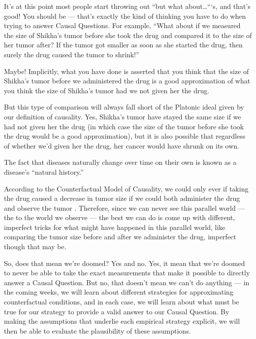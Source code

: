 \documentclass[letterpaper,10pt,english]{jupyterBook}
\begin{document}
\sphinxAtStartPar
It’s at this point most people start throwing out “but what about…“‘s, and that’s good! You should be — that’s exactly the kind of thinking you have to do when trying to answer Causal Questions. For example, “What about if we measured the size of Shikha’s tumor before she took the drug and compared it to the size of her tumor after? If the tumor got smaller as soon as she started the drug, then surely the drug caused the tumor to shrink!”

\sphinxAtStartPar
Maybe! Implicitly, what you have done is asserted that you think that the size of Shikha’s tumor before we administered the drug is a good approximation of what you think the size of Shikha’s tumor  had we not given her the drug.

\sphinxAtStartPar
But this type of comparison will always fall short of the Platonic ideal given by our definition of causality. Yes, Shikha’s tumor  have stayed the same size if we had not given her the drug (in which case the size of the tumor before she took the drug would be a good approximation), but it is also possible that regardless of whether we’d given her the drug, her cancer would have shrunk on its own.%
\begin{footnote}[1]\sphinxAtStartFootnote
The fact that diseases naturally change over time on their own is known as a disease’s “natural history.”
%
\end{footnote}

\sphinxAtStartPar
According to the Counterfactual Model of Causality, we could only ever  if taking the drug caused a decrease in tumor size if we could both administer the drug and observe the tumor . Therefore, since we can never see this parallel world — the  to the world we observe — the best we can do is come up with different, imperfect tricks for  what might have happened in this parallel world, like comparing the tumor size before and after we administer the drug, imperfect though that may be.

\sphinxAtStartPar
So, does that mean we’re doomed? Yes and no. Yes, it  mean that we’re doomed to never be able to take the exact measurements that make it possible to directly answer a Causal Question. But no, that doesn’t mean we can’t do anything — in the coming weeks, we will learn about different strategies for approximating counterfactual conditions, and in each case, we will learn about what  must be true for our strategy to provide a valid answer to our Causal Question. By making the assumptions that underlie each empirical strategy explicit, we will then be able to evaluate the plausibility of these assumptions.
\end{document}
